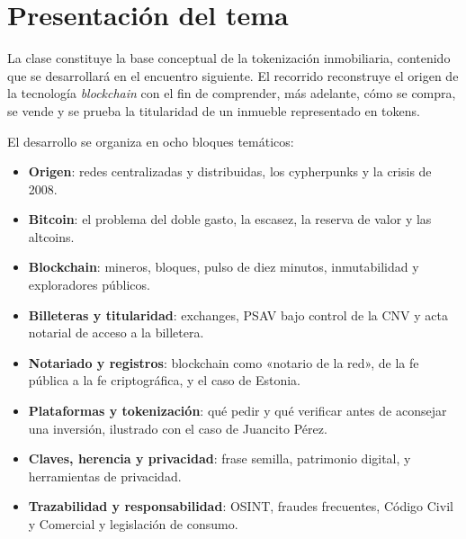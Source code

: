 \documentclass[12pt,oneside]{book}
\begin{document}
\chapter{Presentación del tema}

La clase constituye la base conceptual de la tokenización inmobiliaria, contenido que se desarrollará en el encuentro siguiente. El recorrido reconstruye el origen de la tecnología \textit{blockchain} con el fin de comprender, más adelante, cómo se compra, se vende y se prueba la titularidad de un inmueble representado en tokens.

El desarrollo se organiza en ocho bloques temáticos:

\begin{itemize}
    \item \textbf{Origen}: redes centralizadas y distribuidas, los cypherpunks y la crisis de 2008.
    \item \textbf{Bitcoin}: el problema del doble gasto, la escasez, la reserva de valor y las altcoins.
    \item \textbf{Blockchain}: mineros, bloques, pulso de diez minutos, inmutabilidad y exploradores públicos.
    \item \textbf{Billeteras y titularidad}: exchanges, PSAV bajo control de la CNV y acta notarial de acceso a la billetera.
    \item \textbf{Notariado y registros}: blockchain como «notario de la red», de la fe pública a la fe criptográfica, y el caso de Estonia.
    \item \textbf{Plataformas y tokenización}: qué pedir y qué verificar antes de aconsejar una inversión, ilustrado con el caso de Juancito Pérez.
    \item \textbf{Claves, herencia y privacidad}: frase semilla, patrimonio digital, y herramientas de privacidad.
    \item \textbf{Trazabilidad y responsabilidad}: OSINT, fraudes frecuentes, Código Civil y Comercial y legislación de consumo.
\end{itemize}
\end{document}

